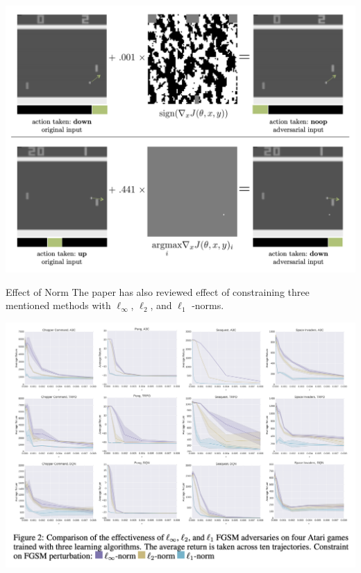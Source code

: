 \documentclass{beamer}
\begin{document}
\begin{frame}
\includegraphics[width= 1\columnwidth]{fig1-l-inf-vs-l-1.png}
\end{frame}


\begin{frame}{Effect of Norm}
The paper has also reviewed effect of constraining three mentioned methods with $\ell_\infty$, $\ell_2$, and $\ell_1$ -norms.

\end{frame}

\begin{frame}
\includegraphics[width =1\columnwidth]{fig2-diff-norms.png}
\end{frame}
\end{document}
